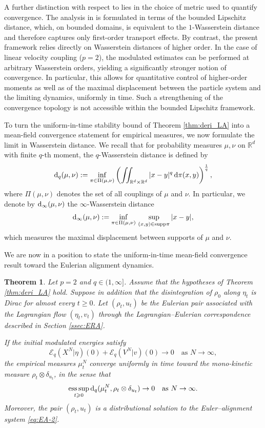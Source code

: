 \documentclass[10pt,reqno]{amsart}
\DeclareMathOperator*{\esssup}{ess\,sup}
\renewcommand{\ge}{\geqslant}
\numberwithin{equation}{section}
\newtheorem{theorem}{Theorem}[section]
\newcommand{\R}{\mathbb R}
\newcommand{\lt}{\left}
\newcommand{\rt}{\right}
\newcommand{\rd}{\textnormal{d}}
\newcommand{\supp}{\text{supp}}
\begin{document}
A further distinction with respect to \cite{CC21} lies in the choice of metric used to quantify convergence. The analysis in \cite{CC21} is formulated in terms of the bounded Lipschitz distance, which, on bounded domains, is equivalent to the $1$-Wasserstein distance and therefore captures only first-order transport effects. By contrast, the present framework relies directly on Wasserstein distances of higher order. In the case of linear velocity coupling ($p=2$), the modulated estimates can be performed at arbitrary Wasserstein orders, yielding a significantly stronger notion of convergence. In particular, this allows for quantitative control of higher-order moments as well as of the maximal displacement between the particle system and the limiting dynamics, uniformly in time. Such a strengthening of the convergence topology is not accessible within the bounded Lipschitz framework.

To turn the uniform-in-time stability bound of Theorem \ref{thm:deri_LA} into a mean-field convergence statement for empirical measures, we now formulate the limit in Wasserstein distance. We recall that for probability measures $\mu,\nu$ on $\R^d$ with finite $q$-th moment, the $q$-Wasserstein distance is defined by
\[
 \rd_q(\mu,\nu) := \inf_{\pi \in \Pi(\mu,\nu)} \lt(\iint_{\R^d\times\R^d} |x-y|^q \, \rd\pi(x,y)\rt)^{\frac1q},
\]
where $\Pi(\mu,\nu)$ denotes the set of all couplings of $\mu$ and $\nu$. In particular, we denote by $ \rd_\infty(\mu,\nu)$ the $\infty$-Wasserstein distance
\[
 \rd_\infty(\mu,\nu) := \inf_{\pi \in \Pi(\mu,\nu)} \, \sup_{(x,y)\in\supp \pi} |x-y|,
\]
which measures the maximal displacement between supports of $\mu$ and $\nu$.

We are now in a position to state the uniform-in-time mean-field convergence result toward the Eulerian alignment dynamics.

\begin{theorem} \label{thm:mf}
Let $p=2$ and $q \in (1,\infty]$. Assume that the hypotheses of Theorem \ref{thm:deri_LA} hold.   Suppose in addition that the disintegration of $\rho_0$ along $\eta_t$ is Dirac for almost every $t\ge0$.  Let $(\rho_t,u_t)$ be the Eulerian pair associated with the Lagrangian flow $(\eta_t,v_t)$ through the Lagrangian--Eulerian correspondence described in Section \ref{ssec:ERA}.

If the initial modulated energies satisfy
\[
\mathscr{E}_q(X^N|\eta)(0)+\mathscr{E}_q(V^N|v)(0)\to 0\quad\text{as }N\to\infty,
\]
the empirical measures $\mu_t^N$ converge uniformly in time toward the mono-kinetic measure $\rho_t\otimes\delta_{u_t}$, in the sense that
\[
\esssup_{t\ge0} \rd_q (\mu_t^N, \rho_t\otimes\delta_{u_t} ) \to 0\quad\text{as }N\to\infty.
\]
Moreover, the pair $(\rho_t,u_t)$ is a distributional solution to the Euler--alignment
system \eqref{eq:EA-2}.
\end{theorem}
\end{document}
